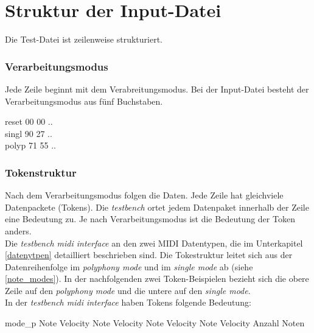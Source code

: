\section{Struktur der Input-Datei}\label{sec.testbench_inputdatei} 

Die Test-Datei ist zeilenweise strukturiert.

\subsubsection{Verarbeitungsmodus} 
Jede Zeile beginnt mit dem Verabreitungsmodus. Bei der Input-Datei besteht der Verarbeitungsmodus aus fünf Buchstaben.

reset	\hspace{2mm} 00 \hspace*{2mm} 	00 \hspace*{2mm} 	..\\
singl	\hspace{2mm} 90 \hspace*{2mm} 	27 \hspace*{2mm} 	..\\
polyp	\hspace{1mm} 71 \hspace*{2mm} 	55 \hspace*{2mm} 	.. 


\subsubsection{Tokenstruktur} 
Nach dem Verarbeitungsmodus folgen die Daten. Jede Zeile hat gleichviele Datenpackete (Tokens). 
Die \textit{testbench} ortet jedem Datenpaket innerhalb der Zeile eine Bedeutung zu. Je nach Verarbeitungsmodus ist die Bedeutung der Token anders.\\ 


Die \textit{testbench midi interface} an den zwei MIDI Datentypen, die im Unterkapitel \ref{datenytpen} detailliert beschrieben sind. Die Tokestruktur leitet sich aus der Datenreihenfolge im \textit{polyphony mode} und im \textit{single mode} ab (siehe  \ref{note_modes}). In der nachfolgenden zwei Token-Beispielen bezieht sich die obere Zeile auf den \textit{polyphony mode} und die untere auf den \textit{single mode}.  \\

In der \textit{testbench midi interface} haben Tokens folgende Bedeutung:


mode\_p	\hspace{1mm} Note \hspace*{4mm} 	Velocity	\hspace*{2mm} Note \hspace*{2mm}  Velocity \hspace*{2mm} 	Note \hspace*{2mm} 	Velocity \hspace*{2mm} 	Note \hspace*{2mm} 	Velocity \hspace*{2mm}  Anzahl Noten

